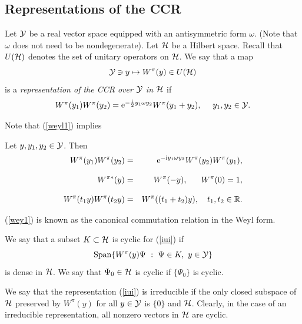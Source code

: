 \documentclass{svmult}
\newcommand{\beq}{\begin{equation}}
\newcommand{\eeq}{\end{equation}}
\def\bet{\begin{theorem}}
\def\eet{\end{theorem}}
\def\rr{{\mathbb R}}
\def\cY{{\cal Y}}
\def\i{{\rm i}}
\def\Span{{\rm Span}}
\def\e{{\rm e}}
\def\cH{{\cal H}}
\def\e{{\rm e}}
\def\cH{{\cal H}}
\begin{document}
\subsection{Representations of the CCR}

 Let $\cY$ be a real vector space equipped with an antisymmetric form
 $\omega$.
(Note that $\omega$ does not need to be nondegenerate).
Let $\cH$ be a Hilbert space. Recall that $U(\cH)$ denotes the set of unitary
operators on $\cH$.
 We say that a map
\beq
\cY\ni y\mapsto W^\pi(y)\in U(\cH)
\label{iui}\eeq is a 
{\em  representation of the CCR
 over $\cY$ in $\cH$}
 if
\beq\begin{array}{l}W^\pi(y_1)W^\pi(y_2)=\e^{-\frac{\i}{2} y_1\omega y_2}
W^\pi(y_1+y_2),\ \ \ \ y_1,y_2\in\cY.
\end{array}\label{weyl1}\eeq





Note that (\ref{weyl1}) implies
\bet Let $y,y_1,y_2\in\cY$. Then
\begin{eqnarray}
W^\pi(y_1)W^\pi(y_2)&=&\e^{-\i y_1\omega y_2}
W^\pi(y_2)W^\pi(y_1),\label{wey1}\\[3mm]
W^{\pi*}(y)&=&W^\pi(-y),\ \ \ \ \ W^\pi(0)=1,\label{wey2}\\[3mm]
W^\pi(t_1y)W^\pi(t_2y)&=&W^\pi((t_1+t_2)y),\ \ \ t_1,t_2\in\rr.\label{wey3}
\end{eqnarray}
\label{weyl2}
\eet
(\ref{wey1}) is known as the canonical commutation relation in the Weyl form.



We say that a subset $K\subset\cH$ is cyclic for (\ref{iui})
if \[\Span\{W^\pi(y)\Psi\ :\ 
\Psi\in K,\ y\in\cY\}\]
 is dense in $\cH$. We say that $\Psi_0\in\cH$
is cyclic
if  $\{\Psi_0\}$ is cyclic.

We say that the 
representation (\ref{iui})
 is irreducible if the only closed subspace of $\cH$ preserved by $W^\pi(y)$
 for all $y\in\cY$ is $\{0\}$ and $\cH$.
 Clearly, in the case of an
irreducible representation, all  nonzero vectors in $\cH$ are cyclic.
\end{document}
